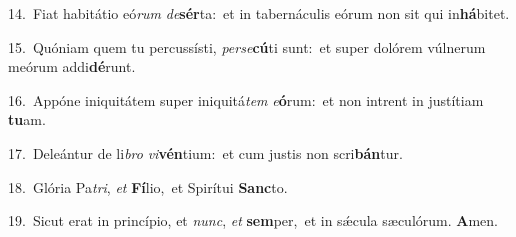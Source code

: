 {\numbfont\textcolor{\numbcolor}{14.}}~Fiat habitátio eó\textit{rum} \textit{de}\-\textbf{sér}ta:~\star et in tabernáculis eórum non sit qui in\-\textbf{há}\-bitet.\par
{\numbfont\textcolor{\numbcolor}{15.}}~Quóniam quem tu percussísti, \textit{per}\-\textit{se}\textbf{cú}ti sunt:~\star et super dolórem vúlnerum meórum addi\-\textbf{dé}\-runt.\par
{\numbfont\textcolor{\numbcolor}{16.}}~Appóne iniquitátem super iniquitá\textit{tem} \textit{e}\-\textbf{ó}rum:~\star et non intrent in justítiam \textbf{tu}\-am.\par
{\numbfont\textcolor{\numbcolor}{17.}}~Deleántur de li\textit{bro} \textit{vi}\-\textbf{vén}tium:~\star et cum justis non scri\-\textbf{bán}\-tur.\par
{\numbfont\textcolor{\numbcolor}{18.}}~Glória Pa\-\textit{tri}\-, \textit{et} \textbf{Fí}\-lio,~\star et Spirítui \textbf{Sanc}\-to.\par
{\numbfont\textcolor{\numbcolor}{19.}}~Sicut erat in princípio, et \textit{nunc}\-, \textit{et} \textbf{sem}\-per,~\star et in sǽcula sæculórum. \textbf{A}\-men.\par
